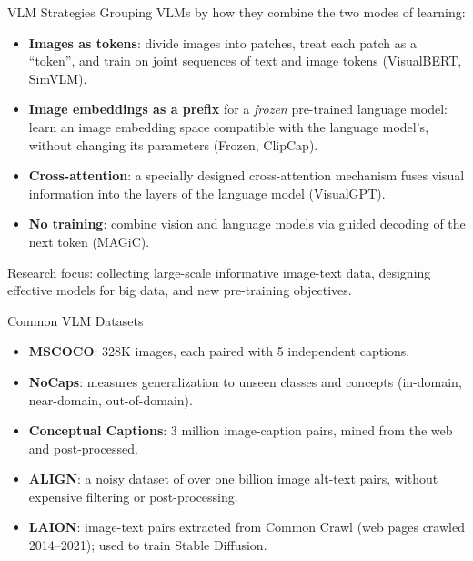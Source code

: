 \begin{frame}{VLM Strategies}
\small%
Grouping VLMs by how they combine the two modes of learning:
\begin{itemize}
  \item \textbf{Images as tokens}: divide images into patches, treat each patch as a \enquote{token}, and train on joint sequences of text and image tokens (VisualBERT, SimVLM).
  \item \textbf{Image embeddings as a prefix} for a \textit{frozen} pre-trained language model: learn an image embedding space compatible with the language model's, without changing its parameters (Frozen, ClipCap).
  \item \textbf{Cross-attention}: a specially designed cross-attention mechanism fuses visual information into the layers of the language model (VisualGPT).
  \item \textbf{No training}: combine vision and language models via guided decoding of the next token (MAGiC).
\end{itemize}
\vspace{0.2cm}
Research focus: collecting large-scale informative image-text data, designing effective models for big data, and new pre-training objectives.
\end{frame}

\begin{frame}{Common VLM Datasets}
\begin{itemize}
  \item \textbf{MSCOCO}: 328K images, each paired with 5 independent captions.
  \item \textbf{NoCaps}: measures generalization to unseen classes and concepts (in-domain, near-domain, out-of-domain).
  \item \textbf{Conceptual Captions}: 3 million image-caption pairs, mined from the web and post-processed.
  \item \textbf{ALIGN}: a noisy dataset of over one billion image alt-text pairs, without expensive filtering or post-processing.
  \item \textbf{LAION}: image-text pairs extracted from Common Crawl (web pages crawled 2014--2021); used to train Stable Diffusion.
\end{itemize}
\end{frame}

